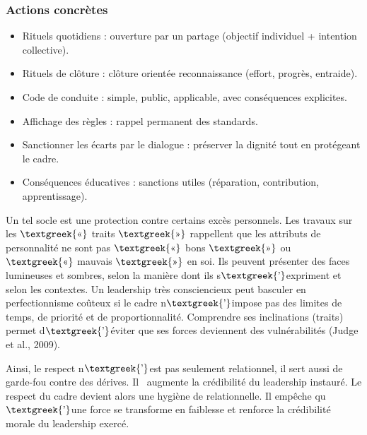 \documentclass{article}
\begin{document}
\subsubsection{Actions concrètes}
\begin{itemize}
\item Rituels quotidiens : ouverture par un partage (objectif individuel + intention collective).
\item Rituels de clôture : clôture orientée reconnaissance (effort, progrès, entraide).
\item Code de conduite : simple, public, applicable, avec conséquences explicites.
\item Affichage des règles : rappel permanent des standards.
\item Sanctionner les écarts par le dialogue : préserver la dignité tout en protégeant le cadre.
\item Conséquences éducatives : sanctions utiles (réparation, contribution, apprentissage). 
\end{itemize}
Un tel socle est une protection contre certains excès personnels. Les travaux sur les $\text{\textgreek{«}}$ traits
$\text{\textgreek{»}}$ rappellent que les attributs de personnalité ne sont pas $\text{\textgreek{«}}$ bons
$\text{\textgreek{»}}$ ou $\text{\textgreek{«}}$ mauvais $\text{\textgreek{»}}$ en soi. Ils peuvent présenter des faces
lumineuses et sombres, selon la manière dont ils s$\text{\textgreek{’}}$expriment et selon les contextes. Un leadership
très consciencieux peut basculer en perfectionnisme coûteux si le cadre n$\text{\textgreek{’}}$impose pas des limites
de temps, de priorité et de proportionnalité. Comprendre ses inclinations (traits) permet d$\text{\textgreek{’}}$éviter
que ses forces deviennent des vulnérabilités \label{ref:RND3eZlw8jUor}(Judge et al., 2009). 

Ainsi, le respect n$\text{\textgreek{’}}$est pas seulement relationnel, il sert aussi de garde-fou contre des dérives.
Il \ augmente la crédibilité du leadership instauré. Le respect du cadre devient alors une hygiène de relationnelle. Il
empêche qu$\text{\textgreek{’}}$une force se transforme en faiblesse et renforce la crédibilité morale du leadership
exercé.
\end{document}
